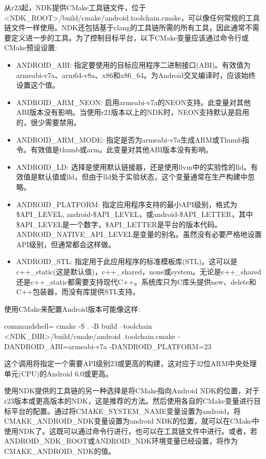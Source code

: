 从r23起，NDK提供CMake工具链文件，位于<NDK\_ROOT>/build/cmake/android.toolchain.cmake，可以像任何常规的工具链文件一样使用。NDK还包括基于clang的工具链所需的所有工具，因此通常不需要定义进一步的工具。为了控制目标平台，以下CMake变量应该通过命令行或CMake预设设置:

\begin{itemize}
\item 
ANDROID\_ABI: 指定要使用的目标应用程序二进制接口(ABI)。有效值为armeabi-v7a、arm64-v8a、x86和x86\_64。为Android交叉编译时，应该始终设置这个值。

\item 
ANDROID\_ARM\_NEON: 启用armeabi-v7a的NEON支持。此变量对其他ABI版本没有影响。当使用r21版本以上的NDK时，NEON支持默认是启用的，很少需要禁用。

\item 
ANDROID\_ARM\_MODE: 指定是否为armeabi-v7a生成ARM或Thumb指令。有效值是thumb或arm。此变量对其他ABI版本没有影响。

\item 
ANDROID\_LD: 选择是使用默认链接器，还是使用llvm中的实验性的lld。有效值是默认值或lld，但由于lld处于实验状态，这个变量通常在生产构建中忽略。

\item 
ANDROID\_PLATFORM: 指定应用程序支持的最小API级别，格式为\$API\_LEVEL, android-\$API\_LEVEL，或android-\$API\_LETTER，其中\$API\_LEVEL是一个数字，\$API\_LETTER是平台的版本代码。ANDROID\_NATIVE\_API\_LEVEL是变量的别名。虽然没有必要严格地设置API级别，但通常都会这样做。

\item 
ANDROID\_STL: 指定用于此应用程序的标准模板库(STL)。这可以是c++\_static(这是默认值)，c++\_shared，none或system。无论是c++\_shared还是c++\_static都需要支持现代C++。系统库只为C库头提供new、delete和C++包装器，而没有库提供STL支持。
\end{itemize}

使用CMake来配置Android版本可能像这样:

\begin{tcblisting}{commandshell={}}
cmake -S . -B build --toolchain <NDK_DIR>/build/cmake/android
  .toolchain.cmake -DANDROID_ABI=armeabi-v7a -DANDROID_PLATFORM=23
\end{tcblisting}

这个调用将指定一个需要API级别23或更高的构建，这对应于32位ARM中央处理单元(CPU)的Android 6.0或更高。

使用NDK提供的工具链的另一种选择是将CMake指向Android NDK的位置，对于r23版本或更高版本的NDK，这是推荐的方法。然后使用各自的CMake变量进行目标平台的配置。通过将CMAKE\_SYSTEM\_NAME变量设置为android，将CMAKE\_ANDROID\_NDK变量设置为android NDK的位置，就可以在CMake中使用NDK了。这既可以通过命令行进行，也可以在工具链文件中进行。或者，若ANDROID\_NDK\_ROOT或ANDROID\_NDK环境变量已经设置，将作为CMAKE\_ANDROID\_NDK的值。

